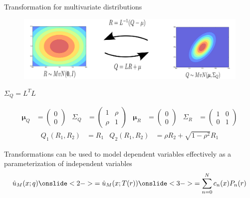\documentclass{beamer}
\begin{document}
\begin{frame}{Transformation for multivariate distributions}{}
\begin{figure}
 \includegraphics[width=\textwidth]{trans1.png}
\end{figure}
    \begin{flushright}
        $\Sigma_Q = L^TL$
    \end{flushright}
    \scriptsize
\pause
    \begin{align*}
        \bm\mu_Q &=
        \begin{pmatrix}
            0 \\ 0
        \end{pmatrix} &
        \Sigma_Q &=
        \begin{pmatrix}
            1 & \rho \\ \rho & 1
        \end{pmatrix} &
        \bm\mu_R &=
        \begin{pmatrix}
            0 \\ 0
        \end{pmatrix} &
        \Sigma_R &=
        \begin{pmatrix}
            1 & 0 \\ 0 & 1
        \end{pmatrix}
    \end{align*}
    \pause
    \normalsize
    \begin{align*}
        Q_1(R_1, R_2) &= R_1 &
        Q_2(R_1, R_2) &= \rho R_2 + \sqrt{1-\rho^2} R_1
    \end{align*}
\end{frame}

\begin{frame}{Transformations can be used to model dependent
    variables effectively as a parameterization of independent
    variables}{}
    \begin{align*}
        \hat u_M(x; q)
        \onslide<2->{= \hat u_M(x; T(r))}
        \onslide<3->{= \sum_{n=0}^N c_n(x) P_n(r)}
    \end{align*}
\end{frame}
\end{document}
